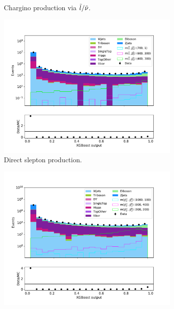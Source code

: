 \begin{figure}[H]
\begin{subfigure}[t!]{0.49\textwidth}
        \caption{Chargino production via $\Tilde{l}/\Tilde{\nu}$.}
        \label{fig:SlepsnuNNLow}
    \end{subfigure}      
    \begin{subfigure}[t!]{0.49\textwidth}
        \includegraphics[width = \textwidth]{Figures/Stacked/stackedplot_BDT_Low_level_slepslep.pdf}
        \caption{Direct slepton production.}
        \label{fig:SlepslepNNLow}
    \end{subfigure}
    \begin{subfigure}[t!]{0.49\textwidth}
        \includegraphics[width = \textwidth]{Figures/Stacked/stackedplot_BDT_Low_level_slepsnu.pdf}

\end{subfigure}
\end{figure}
